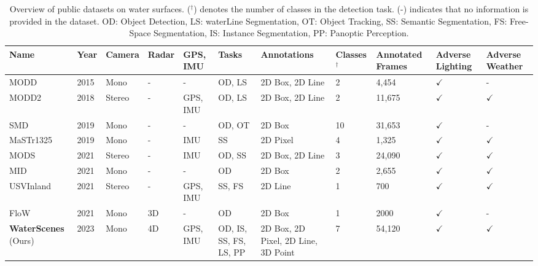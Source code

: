\documentclass[lettersize,journal]{IEEEtran}
\begin{document}
\begin{table*}[!h]
\caption{Overview of public datasets on water surfaces. 
($^{\dagger}$) denotes the number of classes in the detection task. 
(-) indicates that no information is provided in the dataset.
OD: Object Detection, LS: waterLine Segmentation, OT: Object Tracking, SS: Semantic Segmentation, FS: Free-Space Segmentation, IS: Instance Segmentation, PP: Panoptic Perception.}
\setlength\tabcolsep{5pt} \center
\footnotesize
\begin{tabular*}{\linewidth}{p{1.9cm}<{}p{0.7cm}<{\centering}p{1cm}<{\centering}p{0.8cm}<{\centering}p{1.5cm}<{\centering}p{1.6cm}<{\centering}p{2.2cm}<{\centering}p{1.2cm}<{\centering}p{1.2cm}<{\centering}p{1.1cm}<{\centering}p{1.1cm}<{\centering}}
\toprule

\bf{Name} & \bf{Year} & \bf{Camera} & \bf{Radar} & \bf{GPS, IMU} & \bf{Tasks} & \bf{Annotations} & \bf{Classes $^{\dagger}$} & \bf{Annotated Frames} & \bf{Adverse Lighting} & \bf{Adverse Weather}\\\midrule
MODD \cite{kristan2015fast} & 2015 & Mono & - & - & OD, LS & 2D Box, 2D Line & 2 & 4,454 & $\checkmark$ & -  \\
MODD2 \cite{bovcon2018stereo} & 2018 & Stereo & - & GPS, IMU & OD, LS & 2D Box, 2D Line & 2 & 11,675 & $\checkmark$ &  $\checkmark$\\
SMD \cite{moosbauer2019benchmark} & 2019 & Mono & - & - & OD, OT & 2D Box & 10 & 31,653 & $\checkmark$ & - \\
MaSTr1325 \cite{bovcon2019mastr1325} & 2019 & Mono & -  & IMU & SS & 2D Pixel & 4 & 1,325 & $\checkmark$ & $\checkmark$ \\
MODS \cite{bovcon2021mods} & 2021 & Stereo & - & IMU & OD, SS & 2D Box, 2D Line & 3 & 24,090 & $\checkmark$ &  $\checkmark$\\
MID \cite{liu2021efficient} & 2021 & Mono & - & - & OD & 2D Box & 2 & 2,655 & $\checkmark$ &  $\checkmark$ \\
USVInland \cite{cheng2021we} & 2021 & Stereo & - & GPS, IMU & SS, FS & 2D Line & 1 & 700 & $\checkmark$ & $\checkmark$\\
FloW \cite{cheng2021flow} & 2021 & Mono & 3D & - & OD & 2D Box & 1 & 2000 & $\checkmark$ & -\\
\midrule
\textbf{WaterScenes} (Ours) & 2023 & Mono & 4D & GPS, IMU & OD, IS, SS, FS, LS, PP & 2D Box, 2D Pixel, 2D Line, 3D Point & 7 & 54,120 & $\checkmark$ & $\checkmark$  \\
\bottomrule
\end{tabular*}
\label{tab:related-datasets}
\end{table*}
\end{document}

